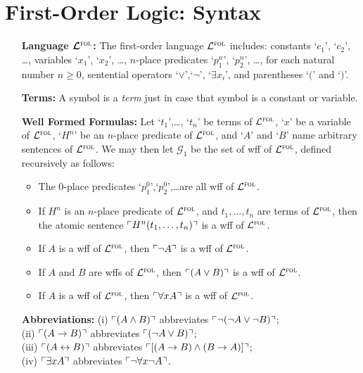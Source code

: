 \documentclass[a4paper, 11pt]{article} %
\begin{document}
\section*{\sc First-Order Logic: Syntax}

\begin{enumerate}[leftmargin=1.2in,labelsep=.15in] %
\item[\bf Language $\boldsymbol{\mathcal{L}^{\textsc{fol}}}$:] The first-order language $\mathcal{L}^{\textsc{fol}}$ includes: constants `$c_1$', `$c_2$', \dots, variables `$x_1$', `$x_2$', \dots, $n$-place predicates `$p_1^n$', `$p_2^n$', \dots, for each natural number $n\geq0$, sentential operators `$\vee$',`$\neg$', `$\exists x_i$', and parentheses `$($' and `$)$'.
\item[\bf Terms:] A symbol is a \textit{term} just in case that symbol is a constant or variable.
\item[\bf Well Formed Formulas:] Let `$t_1$',\dots, `$t_n$' be terms of $\mathcal{L}^{\textsc{fol}}$, `$x$' be a variable of $\mathcal{L}^{\textsc{fol}}$, `$H^n$' be an $n$-place predicate of $\mathcal{L}^{\textsc{fol}}$, and `$A$' and `$B$' name arbitrary sentences of $\mathcal{L}^{\textsc{fol}}$. We may then let $\mathcal{G}_1$ be the set of wff of $\mathcal{L}^{\textsc{fol}}$, defined recursively as follows:
\begin{itemize}
\item The 0-place predicates `$p_1^0$',`$p_2^0$',\dots are all wff of $\mathcal{L}^{\textsc{fol}}$.
\item If ${H^n}$ is an $n$-place predicate of $\mathcal{L}^{\textsc{fol}}$, and ${t_1},\dots,{t_n}$ are terms of $\mathcal{L}^{\textsc{fol}}$, then the atomic sentence $\ulcorner H^n(t_1,\dots,t_n)\urcorner$ is a wff of $\mathcal{L}^{\textsc{fol}}$.
\item If ${A}$ is a wff of $\mathcal{L}^{\textsc{fol}}$, then $\ulcorner\neg A\urcorner$ is a wff of $\mathcal{L}^{\textsc{fol}}$.
\item If ${A}$ and ${B}$ are wffs of $\mathcal{L}^{\textsc{fol}}$, then $\ulcorner(A\vee B)\urcorner$ is a wff of $\mathcal{L}^{\textsc{fol}}$.
\item If ${A}$ is a wff of $\mathcal{L}^{\textsc{fol}}$, then $\ulcorner\forall xA\urcorner$ is a wff of $\mathcal{L}^{\textsc{fol}}$.
\end{itemize}
\item[\bf Abbreviations:] (i) $\ulcorner(A\wedge B)\urcorner$ abbreviates $\ulcorner\neg(\neg A\vee\neg B)\urcorner$;\\ (ii) $\ulcorner(A\rightarrow B)\urcorner$ abbreviates $\ulcorner(\neg A\vee B)\urcorner$;\\ (iii) $\ulcorner(A\leftrightarrow B)\urcorner$ abbreviates $\ulcorner[(A\rightarrow B)\wedge(B\rightarrow A)]\urcorner$;\\ (iv) $\ulcorner\exists xA\urcorner$ abbreviates $\ulcorner\neg\forall x\neg A\urcorner$.
\end{enumerate}
\end{document}
